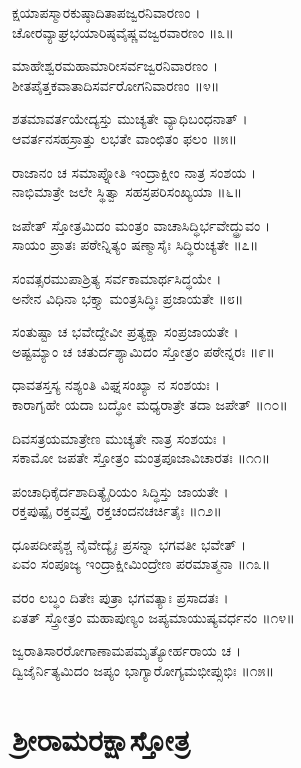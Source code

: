 ಕ್ಷಯಾಪಸ್ಮಾರಕುಷ್ಠಾದಿತಾಪಜ್ವರನಿವಾರಣಂ ।\\
ಚೋರವ್ಯಾಘ್ರಭಯಾರಿಷ್ಠವೈಷ್ಣವಜ್ವರವಾರಣಂ ॥೩॥

ಮಾಹೇಶ್ವರಮಹಾಮಾರೀಸರ್ವಜ್ವರನಿವಾರಣಂ ।\\
ಶೀತಪೈತ್ತಕವಾತಾದಿಸರ್ವರೋಗನಿವಾರಣಂ ॥೪॥

ಶತಮಾವರ್ತಯೇದ್ಯಸ್ತು ಮುಚ್ಯತೇ ವ್ಯಾಧಿಬಂಧನಾತ್ ।\\
ಆವರ್ತನಸಹಸ್ರಾತ್ತು ಲಭತೇ ವಾಂಛಿತಂ ಫಲಂ ॥೫॥

ರಾಜಾನಂ ಚ ಸಮಾಪ್ನೋತಿ ಇಂದ್ರಾಕ್ಷೀಂ ನಾತ್ರ ಸಂಶಯ ।\\
ನಾಭಿಮಾತ್ರೇ ಜಲೇ ಸ್ಥಿತ್ವಾ ಸಹಸ್ರಪರಿಸಂಖ್ಯಯಾ ॥೬॥

ಜಪೇತ್ ಸ್ತೋತ್ರಮಿದಂ ಮಂತ್ರಂ ವಾಚಾಸಿದ್ಧಿರ್ಭವೇದ್ಧ್ರುವಂ ।\\
ಸಾಯಂ ಪ್ರಾತಃ ಪಠೇನ್ನಿತ್ಯಂ ಷಣ್ಮಾಸೈಃ ಸಿದ್ಧಿರುಚ್ಯತೇ ॥೭॥

ಸಂವತ್ಸರಮುಪಾಶ್ರಿತ್ಯ ಸರ್ವಕಾಮಾರ್ಥಸಿದ್ಧಯೇ ।\\
ಅನೇನ ವಿಧಿನಾ ಭಕ್ತ್ಯಾ ಮಂತ್ರಸಿದ್ಧಿಃ ಪ್ರಜಾಯತೇ ॥೮॥

ಸಂತುಷ್ಟಾ ಚ ಭವೇದ್ದೇವೀ ಪ್ರತ್ಯಕ್ಷಾ ಸಂಪ್ರಜಾಯತೇ ।\\
ಅಷ್ಟಮ್ಯಾಂ ಚ ಚತುರ್ದಶ್ಯಾಮಿದಂ ಸ್ತೋತ್ರಂ ಪಠೇನ್ನರಃ ॥೯॥

ಧಾವತಸ್ತಸ್ಯ ನಶ್ಯಂತಿ ವಿಘ್ನಸಂಖ್ಯಾ ನ ಸಂಶಯಃ ।\\
ಕಾರಾಗೃಹೇ ಯದಾ ಬದ್ಧೋ ಮಧ್ಯರಾತ್ರೇ ತದಾ ಜಪೇತ್ ॥೧೦॥

ದಿವಸತ್ರಯಮಾತ್ರೇಣ ಮುಚ್ಯತೇ ನಾತ್ರ ಸಂಶಯಃ ।\\
ಸಕಾಮೋ ಜಪತೇ ಸ್ತೋತ್ರಂ ಮಂತ್ರಪೂಜಾವಿಚಾರತಃ ॥೧೧॥

ಪಂಚಾಧಿಕೈರ್ದಶಾದಿತ್ಯೈರಿಯಂ ಸಿದ್ಧಿಸ್ತು ಜಾಯತೇ ।\\
ರಕ್ತಪುಷ್ಪೈ ರಕ್ತವಸ್ತ್ರೈ ರಕ್ತಚಂದನಚರ್ಚಿತೈಃ ॥೧೨॥

ಧೂಪದೀಪೈಶ್ಚ ನೈವೇದ್ಯೈಃ ಪ್ರಸನ್ನಾ ಭಗವತೀ ಭವೇತ್ ।\\
ಏವಂ ಸಂಪೂಜ್ಯ ಇಂದ್ರಾಕ್ಷೀಮಿಂದ್ರೇಣ ಪರಮಾತ್ಮನಾ ॥೧೩॥

ವರಂ ಲಬ್ಧಂ ದಿತೇಃ ಪುತ್ರಾ ಭಗವತ್ಯಾಃ ಪ್ರಸಾದತಃ ।\\
ಏತತ್ ಸ್ತ್ರೋತ್ರಂ ಮಹಾಪುಣ್ಯಂ ಜಪ್ಯಮಾಯುಷ್ಯವರ್ಧನಂ ॥೧೪॥

ಜ್ವರಾತಿಸಾರರೋಗಾಣಾಮಪಮೃತ್ಯೋರ್ಹರಾಯ ಚ ।\\
ದ್ವಿಜೈರ್ನಿತ್ಯಮಿದಂ ಜಪ್ಯಂ ಭಾಗ್ಯಾರೋಗ್ಯಮಭೀಪ್ಸುಭಿಃ ॥೧೫॥



\section{ಶ್ರೀರಾಮರಕ್ಷಾಸ್ತೋತ್ರ}

